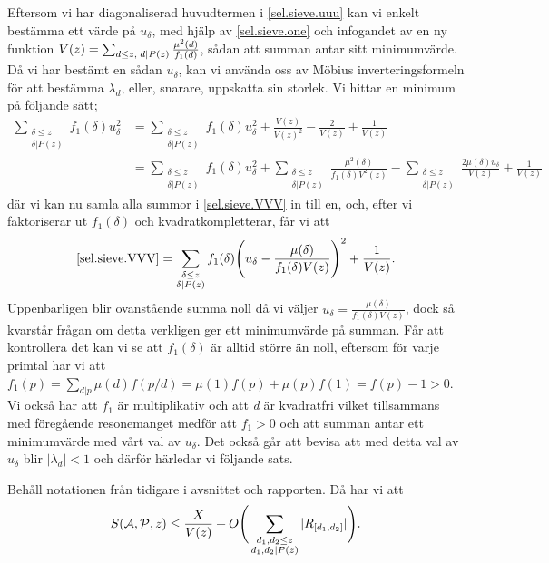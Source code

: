 Eftersom vi har diagonaliserad huvudtermen i \eqref{sel.sieve.uuu} kan vi enkelt bestämma ett värde på \(u_\delta\), med hjälp av \eqref{sel.sieve.one} och infogandet av en ny funktion \(V(z) = \sum_{d\leq z,\; d\mid P(z)}\frac{\mu^2(d)}{f_1(d)}\), sådan att summan antar sitt minimumvärde.
Då vi har bestämt en sådan \(u_\delta\), kan vi använda oss av Möbius inverteringsformeln för att bestämma \(\lambda_d\), eller, snarare, uppskatta sin storlek.
Vi hittar en minimum på följande sätt;
\begin{align}
    \sum_{\substack{\delta \leq z\\ \delta | P(z)}}f_1(\delta) u_\delta^2 &= \sum_{\substack{\delta\leq z\\\delta|P(z)}} f_1(\delta)u_\delta^2 + \frac{V(z)}{V(z)^2} - \frac{2}{V(z)} + \frac{1}{V(z)}\nonumber\\
    &= \sum_{\substack{\delta\leq z\\\delta|P(z)}} f_1(\delta)u_\delta^2 + \sum_{\substack{\delta\leq z\\ \delta|P(z)}}\frac{\mu^2(\delta)}{f_1(\delta)V^2(z)} - \sum_{\substack{\delta\leq z\\\delta |P(z)}}\frac{2\mu(\delta)u_\delta}{V(z)} + \frac{1}{V(z)}\label{sel.sieve.VVV}
\end{align}
där vi kan nu samla alla summor i \eqref{sel.sieve.VVV} in till en, och, efter vi faktoriserar ut \(f_1(\delta)\) och kvadratkompletterar, får vi att
\begin{equation}
    \eqref{sel.sieve.VVV} = \sum_{\substack{\delta\leq z\\\delta|P(z)}}f_1(\delta)\Bigg(u_\delta - \frac{\mu(\delta)}{f_1(\delta)V(z)}\Bigg)^2 + \frac{1}{V(z)}.\nonumber
\end{equation}
Uppenbarligen blir ovanstående summa noll då vi väljer \(u_\delta = \frac{\mu(\delta)}{f_1(\delta)V(z)}\), dock så kvarstår frågan om detta verkligen ger ett minimumvärde på summan. Får att kontrollera det kan vi se att \(f_1(\delta)\) är alltid större än noll, eftersom för varje primtal har vi att \(f_1(p) = \sum_{d|p}\mu(d)f({p}/{d}) = \mu(1)f(p) + \mu(p)f(1) = f(p) - 1 > 0\). 
Vi också har att \(f_1\) är multiplikativ och att \textit{d} är kvadratfri vilket tillsammans med föregående resonemanget medför att \(f_1 > 0\) och att summan antar ett minimumvärde med vårt val av \(u_\delta\).
Det också går att bevisa \cite[s. 122-123]{cojocarumurty} att med detta val av \(u_\delta\) blir \(|\lambda_d| < 1\) och därför härledar vi följande sats.
\begin{theorem}\label{sel.sieve.thm}
Behåll notationen från tidigare i avsnittet och rapporten. Då har vi att
\begin{equation}
    S(\mathcal{A}, \mathcal{P}, z) \leq \frac{X}{V(z)} + O\Bigg(\sum_{\substack{d_1,d_2\leq z\\d_1,d_2\mid P(z)}}|R_{[d_1, d_2]}|\Bigg).\nonumber
\end{equation}
\end{theorem}

